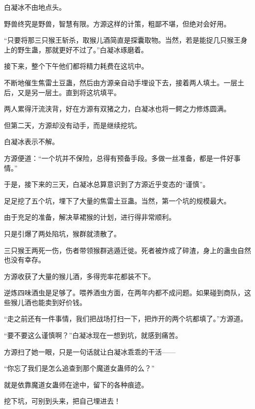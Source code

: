 \begin{this_body}
白凝冰不由地点头。

野兽终究是野兽，智慧有限。方源这样的计策，粗鄙不堪，但绝对会好用。

“只要将那三只猴王斩杀，取猴儿酒简直是探囊取物。当然，若是能捉几只猴王身上的野生蛊，那就更好不过了。”白凝冰琢磨着。

接下来，整个下午他们都将精力耗费在这坑中。

不断地催生焦雷土豆蛊，然后由方源亲自动手埋设下去，接着两人填土。一层土后，又是另一层土。直到将这坑填平。

两人累得汗流浃背，好在方源有双猪之力，白凝冰也将一鳄之力修炼圆满。

但第二天，方源却没有动手，而是继续挖坑。

白凝冰表示不解。

方源便道：“一个坑并不保险，总得有预备手段。多做一丝准备，都是一件好事情。”

于是，接下来的三天，白凝冰总算意识到了方源近乎变态的“谨慎”。

足足挖了五个坑，埋下了大量的焦雷土豆蛊。当然，第一个坑的规模最大。

由于充足的准备，解决草裙猴的计划，进行得非常顺利。

只是引爆了两处陷坑，猴群就溃散了。

三只猴王两死一伤，伤者带领猴群逃遁迁徙。死者被炸成了碎渣，身上的蛊虫自然也没有幸存。

方源收获了大量的猴儿酒，多得兜率花都装不下。

逆炼四味酒虫是足够了。喂养酒虫方面，在两年内都不成问题。如果碰到商队，这些猴儿酒也能卖到好价钱。

“走之前还有一件事情，我们把战场打扫一下，把炸开的两个坑都填了。”方源道。

“要不要这么谨慎啊？”白凝冰现在一想到坑，就感到痛苦。

方源扫了她一眼，只是一句话就让白凝冰乖乖的干活——

“你忘了我们是怎么追查到那个魔道女蛊师的么？”

就是依靠魔道女蛊师在途中，留下的各种痕迹。

挖下坑，可别到头来，把自己埋进去！

\end{this_body}

